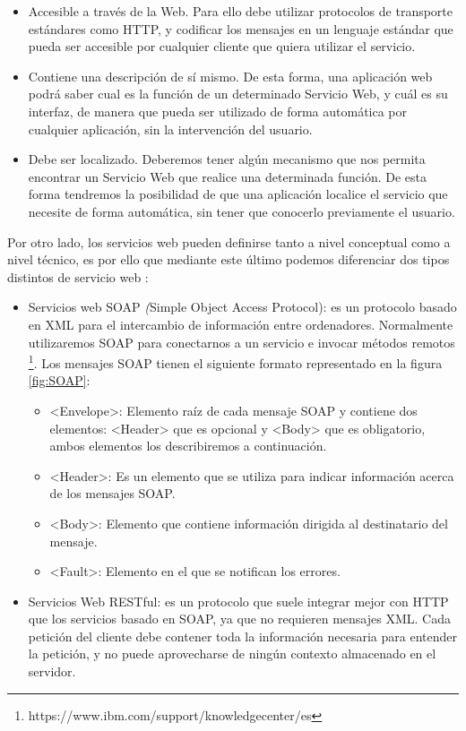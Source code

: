 \begin{itemize}
	\item Accesible a través de la Web. Para ello debe utilizar protocolos de transporte estándares como HTTP, y codificar los mensajes en un lenguaje estándar que pueda ser accesible por cualquier cliente que quiera utilizar el servicio. 
	\item Contiene una descripción de sí mismo. De esta forma, una aplicación web podrá saber cual es la función de un determinado Servicio Web, y cuál es su interfaz, de manera que pueda ser utilizado de forma automática por cualquier aplicación, sin la intervención del usuario.
	\item Debe ser localizado. Deberemos tener algún mecanismo que nos permita encontrar un Servicio Web que realice una determinada función. De esta forma tendremos la posibilidad de que una aplicación localice el servicio que necesite de forma automática, sin tener que conocerlo previamente el usuario.
\end{itemize}

Por otro lado, los servicios web pueden definirse tanto a nivel conceptual como a nivel técnico, es por ello que mediante este último podemos diferenciar dos tipos distintos de servicio web \citep{TorresJoaquin2017SC}:
\begin{itemize}
	\item Servicios web SOAP  \textit({Simple Object Access Protocol}): es un protocolo basado en XML para el intercambio de información entre ordenadores. Normalmente utilizaremos SOAP para conectarnos a un servicio e invocar métodos remotos 
	\footnote{https://www.ibm.com/support/knowledgecenter/es}. Los mensajes SOAP tienen el siguiente formato representado en la figura \ref{fig:SOAP}:

	
	\begin{itemize}
		\item <Envelope>: Elemento raíz de cada mensaje SOAP y contiene dos elementos: <Header> que es opcional y <Body> que es obligatorio, ambos elementos los describiremos a continuación.
		\item <Header>: Es un elemento que se utiliza para indicar información acerca de los mensajes SOAP.
		\item <Body>: Elemento que contiene información dirigida al destinatario del mensaje.
		\item <Fault>: Elemento en el que se notifican los errores.
			
	\end{itemize}

	\item Servicios Web RESTful: es un protocolo que suele integrar mejor con HTTP que los servicios basado en SOAP, ya que no requieren mensajes XML. Cada petición del cliente debe contener toda la información necesaria para entender la petición, y no puede aprovecharse de ningún contexto almacenado en el servidor.
	
\end{itemize}


